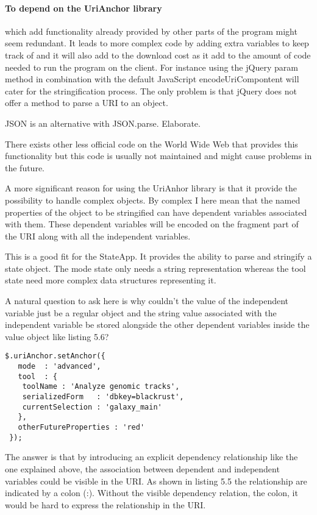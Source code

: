 \documentclass[english]{ifimaster}
\begin{document}
\paragraph{To depend on the UriAnchor library} which add functionality already provided by other parts of the program might seem redundant. It leads to more complex code by adding extra variables to keep track of and it will also add to the download cost as it add to the amount of code needed to run the program on the client. For instance using the jQuery param method in combination with the default JavaScript encodeUriCompontent will cater for the stringification process. The only problem is that jQuery does not offer a method to parse a URI to an object. 

JSON is an alternative with JSON.parse. Elaborate.

There exists other less official code on the World Wide Web that provides this functionality but this code is usually not maintained and might cause problems in the future. 

A more significant reason for using the UriAnhor library is that it provide the possibility to handle complex objects. By complex I here mean that the named properties of the object to be stringified can have dependent variables associated with them. These dependent variables will be encoded on the fragment part of the URI along with all the independent variables. 

This is a good fit for the StateApp. It provides the ability to parse and stringify a state object. The mode state only needs a string representation whereas the tool state need more complex data structures representing it. 

A natural question to ask here is why couldn't the value of the independent variable just be a regular object and the string value associated with the independent variable be stored alongside the other dependent variables inside the value object like listing 5.6?

\begin{lstlisting}[caption=Example of a stringified complex object.]
 $.uriAnchor.setAnchor({
   mode  : 'advanced',
   tool  : {
    toolName : 'Analyze genomic tracks',
    serializedForm   : 'dbkey=blackrust',
    currentSelection : 'galaxy_main'
   },
   otherFutureProperties : 'red'
 });
 \end{lstlisting}

The answer is that by introducing an explicit dependency relationship like the one explained above, the association between dependent and independent variables could be visible in the URI. As shown in listing 5.5 the relationship are indicated by a colon (:). Without the visible dependency relation, the colon, it would be hard to express the relationship in the URI. 
\end{document}

